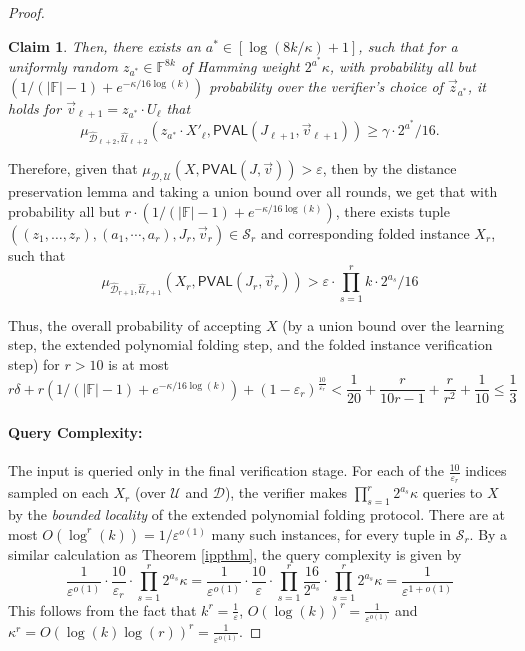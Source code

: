 \documentclass[10pt,a4paper]{article}
\newtheorem{claim}[theorem]{Claim}
\newcommand{\PVAL}{\mathsf{PVAL}}
\newcommand{\F}{\mathbb{F}}
\newcommand{\sU}{\mathcal{U}}
\newcommand{\sD}{\mathcal{D}}
\begin{document}
\begin{proof}
\begin{claim}
Then, there exists an $a^* \in [\log (8k/\kappa)+1]$, such that for a uniformly random $z_{a^*} \in \F^{8k}$ of Hamming weight $2^{a^*}\kappa$, with probability all but $(1/(\vert \F\vert -1)+e^{-\kappa/16 \log (k)})$ probability over the verifier’s choice of $\vec{z}_{a^{\ast}}$, it holds for $\vec{v}_{\ell+1}=z_{a^{\ast}}\cdot U_\ell$ that
\begin{equation*}
    \mu_{\widehat{\sD}_{\ell+2},\widehat{\sU}_{\ell+2}} (z_{a^*} \cdot X'_\ell,\PVAL(J_{\ell+1},\vec{v}_{\ell+1})) \geq \gamma \cdot2^{a^{\ast}}/16.
\end{equation*}
\end{claim}

Therefore, given that $\mu_{\sD,\sU}(X,\PVAL(J,\vec{v}))>\varepsilon$, then by the distance preservation lemma and taking a union bound over all rounds, we get that with probability all but $r \cdot (1/(\vert \F\vert -1)+e^{-\kappa/16 \log (k)})$, there exists tuple $((z_1,\dots,z_{r}), (a_{1},\cdots, a_{r}), J_{r},\vec{v}_{r}) \in \mathcal{S}_r$ and corresponding folded instance $X_{r}$, such that 
\begin{equation*}
    \mu_{\widehat{\sD}_{r+1},\widehat{\sU}_{r+1}}(X_r, \PVAL(J_r,\vec{v}_r)) > \varepsilon\cdot \prod_{s=1}^{r}k \cdot 2^{a_{s}}/16
\end{equation*}

Thus, the overall probability of accepting $X$ (by a union bound over the learning step, the extended polynomial folding step, and the folded instance verification step) for $r>10$ is at most
\begin{equation*}
    r\delta + r(1/(\vert \F\vert -1) + e^{-\kappa/16 \log (k)}) + (1-\varepsilon_{r})^{\frac{10}{\varepsilon_{r}}} < \frac{1}{20}+\frac{r}{10r-1}+\frac{r}{r^{2}}+ \frac{1}{10}\leq \frac{1}{3}
\end{equation*}
\vspace{0.1in}

\paragraph*{Query Complexity:} The input is queried only in the final verification stage. For each of the $\frac{10}{\varepsilon_{r}}$ indices sampled on each $X_{r}$ (over $\sU$ and $\sD$), the verifier makes $\prod_{s=1}^{r}2^{a_{s}}\kappa$ queries to $X$ by the \textit{bounded locality} of the extended polynomial folding protocol. There are at most $O(\log^{r} (k))=1/\varepsilon^{o(1)}$ many such instances, for every tuple in $\mathcal{S}_r$. By a similar calculation as Theorem \ref{ippthm}, the query complexity is given by 
\begin{equation*}
    \frac{1}{\varepsilon^{o(1)}}\cdot \frac{10}{\varepsilon_{r}}\cdot\prod_{s=1}^{r}2^{a_{s}}\kappa =\frac{1}{\varepsilon^{o(1)}}\cdot \frac{10}{\varepsilon}\cdot\prod_{s=1}^{r}\frac{16}{2^{a_{s}}}\cdot\prod_{s=1}^{r}2^{a_{s}}\kappa =\frac{1}{\varepsilon^{1+o(1)}}
\end{equation*}
\noindent This follows from the fact that $k^{r}=\frac{1}{\varepsilon}$, $O(\log (k))^{r}=\frac{1}{\varepsilon^{o(1)}}$ and $\kappa^{r}=O(\log (k) \log (r))^{r}=\frac{1}{\varepsilon^{o(1)}}$. 


\end{proof}
\end{document}
